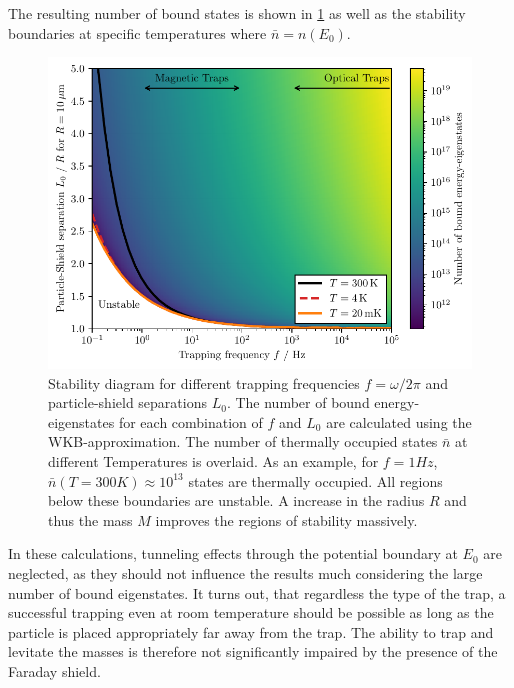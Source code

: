 The resulting number of bound states is shown in \cref{fig:4:trap-stability} as well as the stability boundaries at specific temperatures where $\bar{n} = n(E_0)$.
\begin{figure}[!htbp]
  \centering
  \includegraphics[width=\textwidth]{./../figures/others/trap-stability-with-R.pdf}
  \caption{Stability diagram for different trapping frequencies $f = \omega/2\pi$ and particle-shield separations $L_0$. The number of bound energy-eigenstates for each combination of $f$ and $L_0$ are calculated using the WKB-approximation. The number of thermally occupied states $\bar{n}$ at different Temperatures is overlaid. As an example, for $f=1\si{Hz}$, $\bar{n}(T=300\si{K})\approx 10^{13}$ states are thermally occupied. All regions below these boundaries are unstable. A increase in the radius $R$ and thus the mass $M$ improves the regions of stability massively.}
  \label{fig:4:trap-stability}
\end{figure}
In these calculations, tunneling effects through the potential boundary at $E_0$ are neglected, as they should not influence the results much considering the large number of bound eigenstates.
It turns out, that regardless the type of the trap, a successful trapping even at room temperature should be possible as long as the particle is placed appropriately far away from the trap.
The ability to trap and levitate the masses is therefore not significantly impaired by the presence of the Faraday shield.